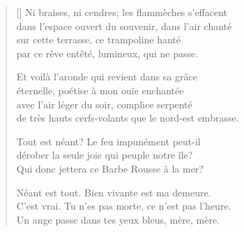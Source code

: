 



\settowidth{\versewidth}{C'est vrai. Tu n'es pas morte, ce n'est pas l'heure.}

\bigskip

\begin{verse}[\versewidth]
Ni braises, ni cendres; les flammèches s'effacent \\
dans l'espace ouvert du souvenir, dans l'air chanté \\
sur cette terrasse, ce trampoline hanté \\
par ce rêve entêté, lumineux, qui ne passe.

Et voilà l'aronde qui revient dans sa grâce \\
éternelle, poétise à mon ouïe enchantée \\
avec l'air léger du soir, complice serpenté \\
de très hauts cerfs-volants que le nord-est embrasse.

Tout est néant? Le feu impunément peut-il \\
dérober la seule joie qui peuple notre île? \\
Qui donc jettera ce Barbe Rousse à la mer?

Néant est tout. Bien vivante est ma demeure. \\
C'est vrai. Tu n'es pas morte, ce n'est pas l'heure. \\
Un ange passe dans tes yeux bleus, mère, mère.
\end{verse}

\bigskip \bigskip

\cleardoublepage



\settowidth{\versewidth}{A ese alado ladrón, ?`no hay quién le ladre?}

\bigskip

